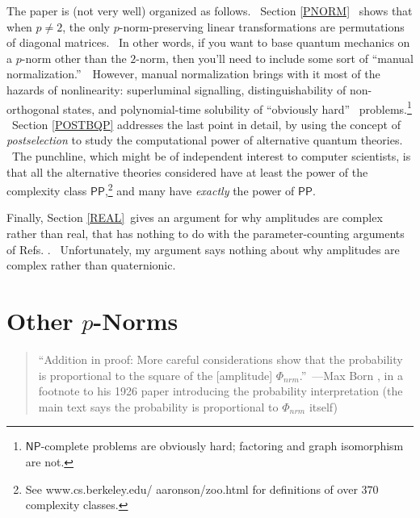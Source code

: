 \documentclass{article}%
\begin{document}
The paper is (not very well) organized as follows. \ Section \ref{PNORM}%
\ shows that when $p\neq2$, the only $p$-norm-preserving linear
transformations are permutations of diagonal matrices. \ In other words, if
you want to base quantum mechanics on a $p$-norm other than the $2$-norm, then
you'll need to include some sort of \textquotedblleft manual
normalization.\textquotedblright\ \ However, manual normalization brings with
it most of the hazards of nonlinearity: superluminal signalling,
distinguishability of non-orthogonal states, and polynomial-time solubility of
\textquotedblleft obviously hard\textquotedblright
\ problems.\footnote{$\mathsf{NP}$-complete problems are obviously hard;
factoring and graph isomorphism are not.} \ Section \ref{POSTBQP} addresses
the last point in detail, by using the concept of \textit{postselection} to
study the computational power of alternative quantum theories. \ The
punchline, which might be of independent interest to computer scientists, is
that all the alternative theories considered have at least the power of the
complexity class $\mathsf{PP}$,\footnote{See www.cs.berkeley.edu/%
aaronson/zoo.html for definitions of over $370$ complexity classes.} and many
have \textit{exactly} the power of $\mathsf{PP}$.

Finally, Section \ref{REAL}\ gives an argument for why amplitudes are complex
rather than real, that has nothing to do with the parameter-counting arguments
of Refs. \cite{cfr,cfs,hardy}. \ Unfortunately, my argument says nothing about
why amplitudes are complex rather than quaternionic.

\section{Other $p$-Norms\label{PNORM}}

\begin{quote}
\textquotedblleft Addition in proof: More careful considerations show that the
probability is proportional to the square of the [amplitude] $\Phi_{nrm}%
$.\textquotedblright\ ---Max Born \cite{born}, in a footnote to his 1926 paper
introducing the probability interpretation (the main text says the probability
is proportional to $\Phi_{nrm}$ itself)
\end{quote}
\end{document}
